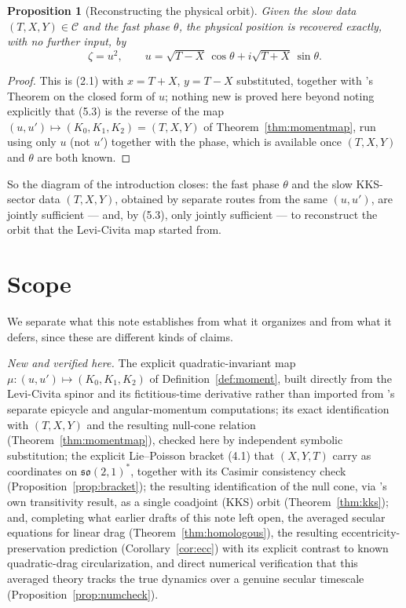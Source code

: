 \documentclass[11pt]{amsart}
\newtheorem{proposition}[theorem]{Proposition}
\theoremstyle{remark}
\begin{document}
\begin{proposition}[Reconstructing the physical orbit]\label{prop:reconstruct}
Given the slow data $(T,X,Y)\in\mathcal C$ and the fast phase $\theta$, the physical position is recovered exactly, with no further input, by
\begin{equation}
\zeta=u^2,\qquad u=\sqrt{T-X}\,\cos\theta+i\sqrt{T+X}\,\sin\theta. \tag{5.3}
\end{equation}
\end{proposition}

\begin{proof}
This is (2.1) with $x=T+X$, $y=T-X$ substituted, together with \cite{Ebert2026LeviCivita}'s Theorem on the closed form of $u$; nothing new is proved here beyond noting explicitly that (5.3) is the reverse of the map $(u,u')\mapsto(K_0,K_1,K_2)=(T,X,Y)$ of Theorem~\ref{thm:momentmap}, run using only $u$ (not $u'$) together with the phase, which is available once $(T,X,Y)$ and $\theta$ are both known.
\end{proof}

So the diagram of the introduction closes: the fast phase $\theta$ and the slow KKS-sector data $(T,X,Y)$, obtained by separate routes from the same $(u,u')$, are jointly sufficient --- and, by (5.3), only jointly sufficient --- to reconstruct the orbit that the Levi-Civita map started from.

\section{Scope}

We separate what this note establishes from what it organizes and from what it defers, since these are different kinds of claims.

\emph{New and verified here.} The explicit quadratic-invariant map $\mu:(u,u')\mapsto(K_0,K_1,K_2)$ of Definition~\ref{def:moment}, built directly from the Levi-Civita spinor and its fictitious-time derivative rather than imported from \cite{Ebert2026Epicycle}'s separate epicycle and angular-momentum computations; its exact identification with $(T,X,Y)$ and the resulting null-cone relation (Theorem~\ref{thm:momentmap}), checked here by independent symbolic substitution; the explicit Lie--Poisson bracket (4.1) that $(X,Y,T)$ carry as coordinates on $\mathfrak{so}(2,1)^*$, together with its Casimir consistency check (Proposition~\ref{prop:bracket}); the resulting identification of the null cone, via \cite{Ebert2026Cone}'s own transitivity result, as a single coadjoint (KKS) orbit (Theorem~\ref{thm:kks}); and, completing what earlier drafts of this note left open, the averaged secular equations for linear drag (Theorem~\ref{thm:homologous}), the resulting eccentricity-preservation prediction (Corollary~\ref{cor:ecc}) with its explicit contrast to known quadratic-drag circularization, and direct numerical verification that this averaged theory tracks the true dynamics over a genuine secular timescale (Proposition~\ref{prop:numcheck}).
\end{document}
